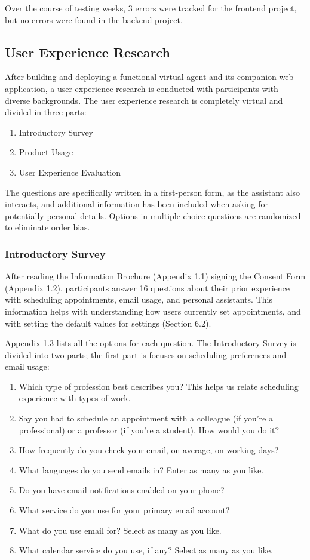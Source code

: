 \documentclass{article}
\begin{document}
Over the course of testing weeks, 3 errors were tracked for the frontend project, but no errors were found in the backend project.

\subsection{User Experience Research}

After building and deploying a functional virtual agent and its companion web application, a user experience research is conducted with participants with diverse backgrounds. The user experience research is completely virtual and divided in three parts:

\begin{enumerate}
	\item Introductory Survey
	\item Product Usage
	\item User Experience Evaluation
\end{enumerate}

The questions are specifically written in a first-person form, as the assistant also interacts, and additional information has been included when asking for potentially personal details. Options in multiple choice questions are randomized to eliminate order bias.

\subsubsection{Introductory Survey}

After reading the Information Brochure (Appendix 1.1) signing the Consent Form (Appendix 1.2), participants answer 16 questions about their prior experience with scheduling appointments, email usage, and personal assistants. This information helps with understanding how users currently set appointments, and with setting the default values for settings (Section 6.2).

Appendix 1.3 lists all the options for each question. The Introductory Survey is divided into two parts; the first part is focuses on scheduling preferences and email usage:

\begin{enumerate}
	\item Which type of profession best describes you? This helps us relate scheduling experience with types of work.
	\item Say you had to schedule an appointment with a colleague (if you're a professional) or a professor (if you're a student). How would you do it?
	\item How frequently do you check your email, on average, on working days?
	\item What languages do you send emails in? Enter as many as you like.
	\item Do you have email notifications enabled on your phone?
	\item What service do you use for your primary email account?
	\item What do you use email for? Select as many as you like.
	\item What calendar service do you use, if any? Select as many as you like.
\end{enumerate}
\end{document}
